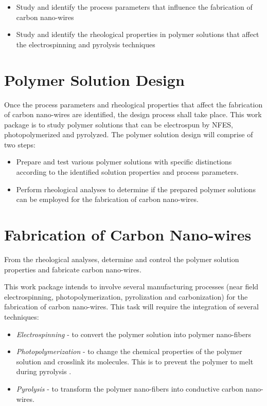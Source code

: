 \begin{itemize}
	\item Study and identify the process parameters that influence the fabrication of carbon nano-wires
	\item Study and identify the rheological properties in polymer solutions that affect the electrospinning and pyrolysis techniques
\end{itemize}

\section{Polymer Solution Design}
Once the process parameters and rheological properties that affect the fabrication of carbon nano-wires are identified, the design process shall take place. This work package is to study polymer solutions that can be electrospun by NFES, photopolymerized and pyrolyzed. The polymer solution design will comprise of two steps:

\begin{itemize}
	\item Prepare and test various polymer solutions with specific distinctions according to the identified solution properties and process parameters.
	\item Perform rheological analyses to determine if the prepared polymer solutions can be employed for the fabrication of carbon nano-wires.
\end{itemize}

\section{Fabrication of Carbon Nano-wires}
From the rheological analyses, determine and control the polymer solution properties and fabricate carbon nano-wires.
	
This work package intends to involve several manufacturing processes (near field electrospinning, photopolymerization, pyrolization and carbonization) for the fabrication of carbon nano-wires. This task will require the integration of several techniques:

\begin{itemize}
	\item \emph{Electrospinning} - to convert the polymer solution into polymer nano-fibers
	\item \emph{Photopolymerization} - to change the chemical properties of the polymer solution and crosslink its molecules. This is to prevent the polymer to melt during pyrolysis \cite{Basu2018}.
	\item \emph{Pyrolysis} - to transform the polymer nano-fibers into conductive carbon nano-wires.
\end{itemize}

